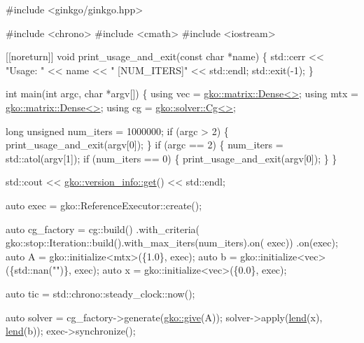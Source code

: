 \begin{DoxyCode}
\textcolor{preprocessor}{#include <ginkgo/ginkgo.hpp>}


\textcolor{preprocessor}{#include <chrono>}
\textcolor{preprocessor}{#include <cmath>}
\textcolor{preprocessor}{#include <iostream>}


[[noreturn]] \textcolor{keywordtype}{void} print\_usage\_and\_exit(\textcolor{keyword}{const} \textcolor{keywordtype}{char} *name)
\{
    std::cerr << \textcolor{stringliteral}{"Usage: "} << name << \textcolor{stringliteral}{" [NUM\_ITERS]"} << std::endl;
    std::exit(-1);
\}


\textcolor{keywordtype}{int} main(\textcolor{keywordtype}{int} argc, \textcolor{keywordtype}{char} *argv[])
\{
    \textcolor{keyword}{using} vec = \hyperlink{classgko_1_1matrix_1_1Dense}{gko::matrix::Dense<>};
    \textcolor{keyword}{using} mtx = \hyperlink{classgko_1_1matrix_1_1Dense}{gko::matrix::Dense<>};
    \textcolor{keyword}{using} cg = \hyperlink{classgko_1_1solver_1_1Cg}{gko::solver::Cg<>};

    \textcolor{keywordtype}{long} \textcolor{keywordtype}{unsigned} num\_iters = 1000000;
    \textcolor{keywordflow}{if} (argc > 2) \{
        print\_usage\_and\_exit(argv[0]);
    \}
    \textcolor{keywordflow}{if} (argc == 2) \{
        num\_iters = std::atol(argv[1]);
        \textcolor{keywordflow}{if} (num\_iters == 0) \{
            print\_usage\_and\_exit(argv[0]);
        \}
    \}

    std::cout << \hyperlink{classgko_1_1version__info_a6daeb8a087cfb57fa055526fc133d8eb}{gko::version\_info::get}() << std::endl;

    \textcolor{keyword}{auto} exec = gko::ReferenceExecutor::create();

    \textcolor{keyword}{auto} cg\_factory =
        cg::build()
            .with\_criteria(
                gko::stop::Iteration::build().with\_max\_iters(num\_iters).on(
                    exec))
            .on(exec);
    \textcolor{keyword}{auto} A = gko::initialize<mtx>(\{1.0\}, exec);
    \textcolor{keyword}{auto} b = gko::initialize<vec>(\{std::nan(\textcolor{stringliteral}{""})\}, exec);
    \textcolor{keyword}{auto} x = gko::initialize<vec>(\{0.0\}, exec);

    \textcolor{keyword}{auto} tic = std::chrono::steady\_clock::now();

    \textcolor{keyword}{auto} solver = cg\_factory->generate(\hyperlink{namespacegko_acbd3fd6d07e498892881e8e2ab0b4167}{gko::give}(A));
    solver->apply(\hyperlink{namespacegko_aa8cb4876b72e5e1036ea9575443c439b}{lend}(x), \hyperlink{namespacegko_aa8cb4876b72e5e1036ea9575443c439b}{lend}(b));
    exec->synchronize();


\end{DoxyCode}

